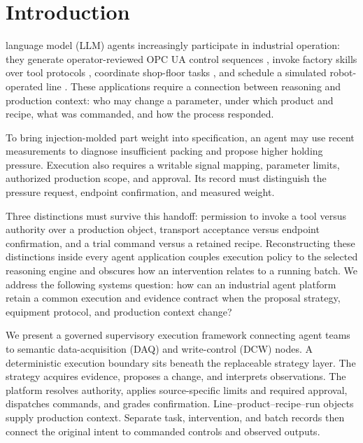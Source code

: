 \section{Introduction}
 language model (LLM) agents increasingly participate in
industrial operation: they generate operator-reviewed OPC UA control sequences
\cite{huang2026made}, invoke factory skills over tool protocols
\cite{koehle2026llmdriven}, coordinate shop-floor tasks
\cite{lim2025llmenabled,zhao2026shopfloor}, and schedule a simulated
robot-operated line \cite{waseem2026pretrained}. These applications require
a connection between reasoning and production context: who may change a
parameter, under which product and recipe, what was commanded, and how the
process responded.

To bring injection-molded part weight into specification, an agent may use
recent measurements to diagnose insufficient packing and propose higher
holding pressure. Execution also requires a writable signal mapping,
parameter limits, authorized production scope, and approval. Its record
must distinguish the pressure request, endpoint confirmation, and measured
weight.

Three distinctions must survive this handoff: permission to invoke a tool
versus authority over a production
object, transport acceptance versus endpoint confirmation, and a trial
command versus a retained recipe. Reconstructing these distinctions inside
every agent application couples execution policy to the selected reasoning
engine and obscures how an intervention relates to a running batch. We
address the following systems question: how can an industrial
agent platform retain a common execution and evidence contract when the
proposal strategy, equipment protocol, and production context change?

We present a governed supervisory execution framework connecting agent
teams to semantic data-acquisition (DAQ) and write-control (DCW) nodes.
A deterministic execution boundary sits beneath the replaceable strategy
layer. The strategy acquires evidence, proposes a change, and interprets
observations. The platform resolves authority, applies source-specific
limits and required approval, dispatches commands, and grades confirmation.
Line--product--recipe--run objects supply production context.
Separate task, intervention, and batch records then connect the original
intent to commanded controls and observed outputs.

